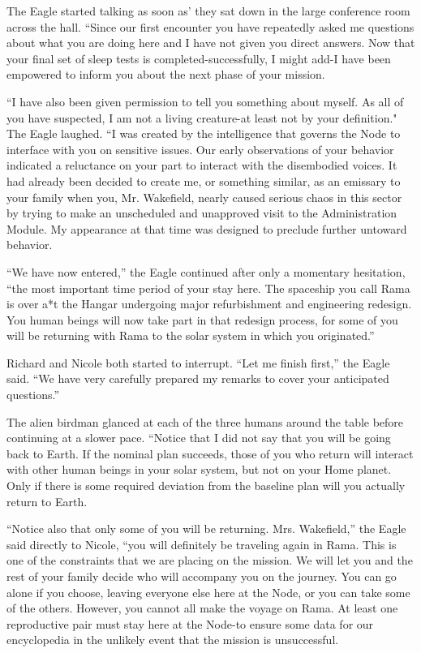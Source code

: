 \documentclass[]{article}
\begin{document}
{The Eagle started talking as soon as’ they sat down in the large conference room across the hall.  “Since our first encounter you have repeatedly asked me questions about what you are doing here and I have not given you direct answers.  Now that your final set of sleep tests is completed-successfully, I might add-I have been empowered to inform you about the next phase of your mission.

“I have also been given permission to tell you something about myself.  As all of you have suspected, I am not a living creature-at least not by your definition."  The Eagle laughed.  “I was created by the intelligence that governs the Node to interface with you on sensitive issues.  Our early observations of your behavior indicated a reluctance on your part to interact with the disembodied voices.  It had already been decided to create me, or something similar, as an emissary to your family when you, Mr.  Wakefield, nearly caused serious chaos in this sector by trying to make an unscheduled and unapproved visit to the Administration Module.  My appearance at that time was designed to preclude further untoward behavior.

“We have now entered,” the Eagle continued after only a momentary hesitation, “the most important time period of your stay here.  The spaceship you call Rama is over a*t the Hangar undergoing major refurbishment and engineering redesign.  You human beings will now take part in that redesign process, for some of you will be returning with Rama to the solar system in which you originated.”

Richard and Nicole both started to interrupt.  “Let me finish first,” the Eagle said.  “We have very carefully prepared my remarks to cover your anticipated questions.”

The alien birdman glanced at each of the three humans around the table before continuing at a slower pace.  “Notice that I did not say that you will be going back to Earth.  If the nominal plan succeeds, those of you who return will interact with other human beings in your solar system, but not on your Home planet.  Only if there is some required deviation from the baseline plan will you actually return to Earth.

“Notice also that only some of you will be returning.  Mrs.  Wakefield,” the Eagle said directly to Nicole, “you will definitely be traveling again in Rama.  This is one of the constraints that we are placing on the mission.  We will let you and the rest of your family decide who will accompany you on the journey.  You can go alone if you choose, leaving everyone else here at the Node, or you can take some of the others.  However, you cannot all make the voyage on Rama.  At least one reproductive pair must stay here at the Node-to ensure some data for our encyclopedia in the unlikely event that the mission is unsuccessful.

}
\end{document}
